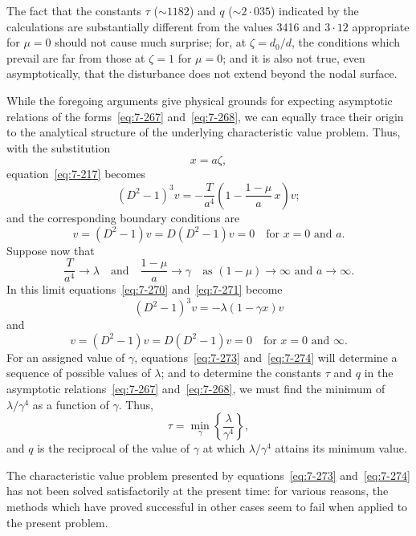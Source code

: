 The fact that the constants $\tau$ ($\sim 1182$) and $q$ ($\sim 2{\cdot}035$) indicated by
the calculations are substantially different from the values 3416 and
$3{\cdot}12$ appropriate for $\mu = 0$ should not cause much surprise; for, at
$\zeta = d_0/d$, the conditions which prevail are far from those at $\zeta = 1$ for
$\mu = 0$; and it is also not true, even asymptotically, that the disturbance
does not extend beyond the nodal surface.

While the foregoing arguments give physical grounds for expecting
asymptotic relations of the forms~\eqref{eq:7-267} and~\eqref{eq:7-268}, we can equally trace
their origin to the analytical structure of the underlying characteristic
value problem.  Thus, with the substitution
\begin{equation}
\label{eq:7-269}
x = a\zeta,
\end{equation}
equation~\eqref{eq:7-217} becomes
\begin{equation}
\label{eq:7-270}
(D^2-1)^3 v = -\frac{T}{a^4}\!\left(1-\frac{1-\mu}{a}\,x\right)v;
\end{equation}
and the corresponding boundary conditions are
\begin{equation}
\label{eq:7-271}
v = (D^2-1)v = D(D^2-1)v = 0
\quad \text{for } x = 0 \text{ and } a.
\end{equation}
Suppose now that
\begin{equation}
\label{eq:7-272}
\frac{T}{a^4} \to \lambda \quad \text{and} \quad
\frac{1-\mu}{a} \to \gamma \quad
\text{as } (1-\mu) \to \infty \text{ and } a \to \infty.
\end{equation}
In this limit equations~\eqref{eq:7-270} and~\eqref{eq:7-271} become
\begin{equation}
\label{eq:7-273}
(D^2-1)^3 v = -\lambda(1-\gamma x)v
\end{equation}
and
\begin{equation}
\label{eq:7-274}
v = (D^2-1)v = D(D^2-1)v = 0
\quad \text{for } x = 0 \text{ and } \infty.
\end{equation}
For an assigned value of $\gamma$, equations~\eqref{eq:7-273} and~\eqref{eq:7-274} will determine
a sequence of possible values of $\lambda$; and to determine the constants $\tau$
and $q$ in the asymptotic relations~\eqref{eq:7-267} and~\eqref{eq:7-268}, we must find the
minimum of $\lambda/\gamma^4$ as a function of $\gamma$.  Thus,
\begin{equation}
\label{eq:7-275}
\tau = \min_\gamma\!\left\{\frac{\lambda}{\gamma^4}\right\},
\end{equation}
and $q$ is the reciprocal of the value of $\gamma$ at which $\lambda/\gamma^4$ attains its minimum
value.

The characteristic value problem presented by equations~\eqref{eq:7-273} and~\eqref{eq:7-274} has not been solved satisfactorily at the present time: for various
reasons, the methods which have proved successful in other cases seem
to fail when applied to the present problem.
